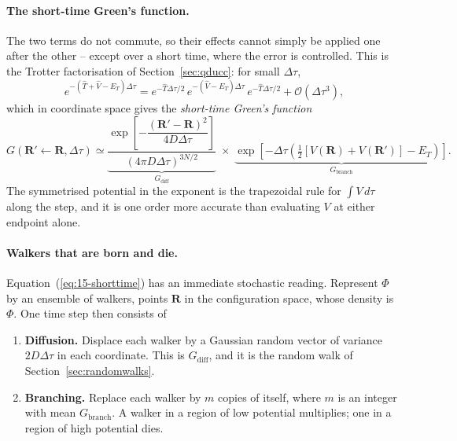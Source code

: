 \paragraph{The short-time Green's function.}
The two terms do not commute, so their effects cannot simply be applied one
after the other -- except over a short time, where the error is controlled.
This is the Trotter factorisation of Section~\ref{sec:qducc}: for small
$\Delta\tau$,
\begin{equation}
  e^{-(\hat{T}+\hat{V}-E_T)\Delta\tau}
   = e^{-\hat{T}\Delta\tau/2}\,e^{-(\hat{V}-E_T)\Delta\tau}\,
     e^{-\hat{T}\Delta\tau/2} + \mathcal{O}(\Delta\tau^3),
  \label{eq:15-trotter}
\end{equation}
which in coordinate space gives the \emph{short-time Green's function}
\begin{equation}
  G(\bm{R}'\!\leftarrow\!\bm{R},\Delta\tau)
   \simeq
   \underbrace{\frac{\exp\!\left[-\dfrac{(\bm{R}'-\bm{R})^2}
       {4D\Delta\tau}\right]}{(4\pi D\Delta\tau)^{3N/2}}}_{
       \textstyle G_{\mathrm{diff}}}
   \;\times\;
   \underbrace{\exp\!\left[-\Delta\tau
     \left(\tfrac12\left[V(\bm{R})+V(\bm{R}')\right]-E_T\right)\right]}_{
       \textstyle G_{\mathrm{branch}}} .
  \label{eq:15-shorttime}
\end{equation}
The symmetrised potential in the exponent is the trapezoidal rule for
$\int V\,d\tau$ along the step, and it is one order more accurate than
evaluating $V$ at either endpoint alone.

\paragraph{Walkers that are born and die.}
Equation~(\ref{eq:15-shorttime}) has an immediate stochastic reading.
Represent $\Phi$ by an ensemble of walkers, points $\bm{R}$ in the
configuration space, whose density is $\Phi$.  One time step then consists of

\begin{svgraybox}
\begin{enumerate}
\item \textbf{Diffusion.}  Displace each walker by a Gaussian random vector of
  variance $2D\Delta\tau$ in each coordinate.  This is $G_{\mathrm{diff}}$,
  and it is the random walk of Section~\ref{sec:randomwalks}.
\item \textbf{Branching.}  Replace each walker by $m$ copies of itself, where
  $m$ is an integer with mean $G_{\mathrm{branch}}$.  A walker in a region of
  low potential multiplies; one in a region of high potential dies.
\end{enumerate}
\end{svgraybox}

